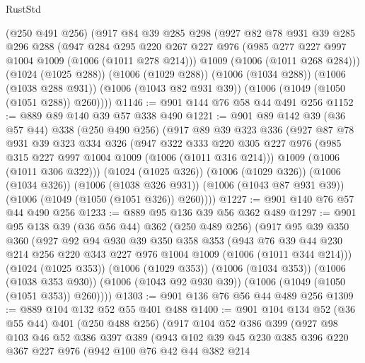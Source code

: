 \begin{lexlean}{RustStd}
\begin{coremodule}
    (@250 @491 @256)
    (@917
      @84
      @39
      @285
      @298
      (@927
        @82
        @78
        @931
        @39
        @285
        @296
        @288
        (@947
          @284
          @295
          @220
          @267
          @227
          @976
          (@985 @277 @227 @997 @1004 @1009 (@1006 (@1011 @278 @214)))
          @1009
          (@1006 (@1011 @268 @284)))
        (@1024 (@1025 @288))
        (@1006 (@1029 @288))
        (@1006 (@1034 @288))
        (@1006 (@1038 @288 @931))
        (@1006 (@1043 @82 @931 @39))
        (@1006 (@1049 (@1050 (@1051 @288)) @260))))
@1146 := @901 @144 @76 @58 @44 @491 @256
@1152 := @889 @89 @140 @39 @57 @338 @490
@1221 := @901
    @89
    @142
    @39
    (@36 @57 @44)
    @338
    (@250 @490 @256)
    (@917
      @89
      @39
      @323
      @336
      (@927
        @87
        @78
        @931
        @39
        @323
        @334
        @326
        (@947
          @322
          @333
          @220
          @305
          @227
          @976
          (@985 @315 @227 @997 @1004 @1009 (@1006 (@1011 @316 @214)))
          @1009
          (@1006 (@1011 @306 @322)))
        (@1024 (@1025 @326))
        (@1006 (@1029 @326))
        (@1006 (@1034 @326))
        (@1006 (@1038 @326 @931))
        (@1006 (@1043 @87 @931 @39))
        (@1006 (@1049 (@1050 (@1051 @326)) @260))))
@1227 := @901 @140 @76 @57 @44 @490 @256
@1233 := @889 @95 @136 @39 @56 @362 @489
@1297 := @901
    @95
    @138
    @39
    (@36 @56 @44)
    @362
    (@250 @489 @256)
    (@917
      @95
      @39
      @350
      @360
      (@927
        @92
        @94
        @930
        @39
        @350
        @358
        @353
        (@943 @76 @39 @44 @230 @214 @256 @220 @343 @227 @976 @1004 @1009 (@1006 (@1011 @344 @214)))
        (@1024 (@1025 @353))
        (@1006 (@1029 @353))
        (@1006 (@1034 @353))
        (@1006 (@1038 @353 @930))
        (@1006 (@1043 @92 @930 @39))
        (@1006 (@1049 (@1050 (@1051 @353)) @260))))
@1303 := @901 @136 @76 @56 @44 @489 @256
@1309 := @889 @104 @132 @52 @55 @401 @488
@1400 := @901
    @104
    @134
    @52
    (@36 @55 @44)
    @401
    (@250 @488 @256)
    (@917
      @104
      @52
      @386
      @399
      (@927
        @98
        @103
        @46
        @52
        @386
        @397
        @389
        (@943
          @102
          @39
          @45
          @230
          @385
          @396
          @220
          @367
          @227
          @976
          (@942
            @100
            @76
            @42
            @44
            @382
            @214

\end{coremodule}
\end{lexlean}
